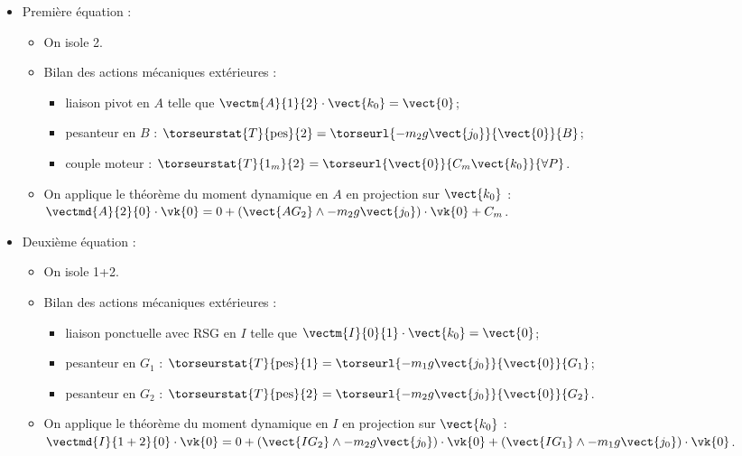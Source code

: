 \begin{itemize}
\item Première équation : 
\begin{itemize}
\item On isole 2.
\item Bilan des actions mécaniques extérieures :
\begin{itemize}
\item liaison pivot en $A$ telle que $\vectm{A}{1}{2}\cdot \vect{k_0} = \vect{0}$;
\item pesanteur en $B$ : $\torseurstat{T}{\text{pes}}{2} = \torseurl{-m_2 g \vect{j_0}}{\vect{0}}{B}$;
\item couple moteur : $\torseurstat{T}{1_m}{2} = \torseurl{\vect{0}}{C_m\vect{k_0}}{\forall P}$.
\end{itemize}
\item On applique le théorème du moment dynamique en $A$ en projection sur $\vect{k_0}$ :
$\vectmd{A}{2}{0}\cdot \vk{0} = 0 + \left(\vect{AG_2}\wedge -m_2 g \vect{j_0}\right)\cdot \vk{0} + C_m$. 

\end{itemize}
\item Deuxième équation : 
\begin{itemize}
\item On isole 1+2.
\item Bilan des actions mécaniques extérieures :
\begin{itemize}
\item liaison ponctuelle avec RSG en $I$ telle que $\vectm{I}{0}{1}\cdot \vect{k_0} = \vect{0}$; 
\item pesanteur en $G_1$  : $\torseurstat{T}{\text{pes}}{1} = \torseurl{-m_1 g \vect{j_0}}{\vect{0}}{G_1}$;
\item pesanteur en $G_2$  : $\torseurstat{T}{\text{pes}}{2} = \torseurl{-m_2 g \vect{j_0}}{\vect{0}}{G_2}$.
\end{itemize}
\item On applique le théorème du moment dynamique en $I$ en projection sur $\vect{k_0}$ :
$\vectmd{I}{1+2}{0}\cdot \vk{0} = 0 + \left(\vect{IG_2}\wedge -m_2 g \vect{j_0}\right)\cdot \vk{0} +\left(\vect{IG_1}\wedge -m_1 g \vect{j_0}\right)\cdot \vk{0} $. 
\end{itemize}
\end{itemize}
\else
\fi



\ifcolle
{}
\else
\fi

\ifprof
\else


\fi